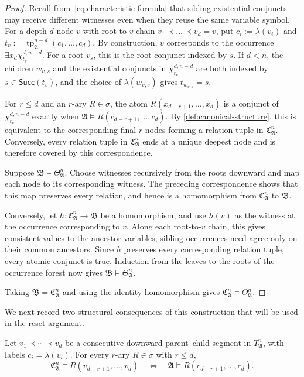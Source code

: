 \documentclass{lmcs}
\newcommand{\tp}{\operatorname{tp}}
\newcommand{\A}{\mathfrak{A}}
\newcommand{\B}{\mathfrak{B}}
\newcommand{\C}{\mathfrak{C}}
\begin{document}
\begin{proof}
Recall from~\eqref{eq:characteristic-formula} that sibling existential conjuncts may receive
different witnesses even when they reuse the same variable symbol.  For a
depth-$d$ node $v$ with root-to-$v$ chain
$v_1\prec\ldots\prec v_d=v$, put $c_i:=\lambda(v_i)$ and
$t_v:=\tp_{\A}^{n-d}(c_1,\ldots,c_d)$.  By construction, $v$ corresponds to
the occurrence $\exists x_d\chi_{t_v}^{d,n-d}$.  For a root $v_s$, this is
the root conjunct indexed by $s$.  If $d<n$, the children $w_{v,s}$ and the existential conjuncts in
$\chi_{t_v}^{d,n-d}$ are both indexed by $s\in\mathsf{Succ}(t_v)$, and the
choice of $\lambda(w_{v,s})$ gives $t_{w_{v,s}}=s$.

For $r\leq d$ and an $r$-ary $R\in\sigma$, the atom
$R(x_{d-r+1},\ldots,x_d)$ is a conjunct of $\chi_{t_v}^{d,n-d}$ exactly when
$\A\models R(c_{d-r+1},\ldots,c_d)$.  By
\cref{def:canonical-structure}, this is equivalent to the corresponding final
$r$ nodes forming a relation tuple in $\C_{\A}^{n}$.  Conversely, every
relation tuple in $\C_{\A}^{n}$ ends at a unique deepest node and is therefore
covered by this correspondence.

Suppose $\B\models\Theta_{\A}^{n}$.  Choose witnesses recursively from the
roots downward and map each node to its corresponding witness.  The preceding
correspondence shows that this map preserves every relation, and hence is a
homomorphism from $\C_{\A}^{n}$ to $\B$.

Conversely, let $h:\C_{\A}^{n}\to\B$ be a homomorphism, and use $h(v)$ as the
witness at the occurrence corresponding to $v$.  Along each root-to-$v$ chain,
this gives consistent values to the ancestor variables; sibling occurrences
need agree only on their common ancestors.  Since $h$ preserves every
corresponding relation tuple, every atomic conjunct is true.  Induction from
the leaves to the roots of the occurrence forest now gives
$\B\models\Theta_{\A}^{n}$.

Taking $\B=\C_{\A}^{n}$ and using the identity homomorphism gives
$\C_{\A}^{n}\models\Theta_{\A}^{n}$.
\end{proof}


We next record two structural consequences of this construction that
will be used in the reset argument.

\begin{prop}\label{prop:local-exact}
Let $v_1\prec\cdots\prec v_d$ be a consecutive downward parent--child segment in $T_{\A}^{n}$, with labels
$c_i=\lambda(v_i)$.  For every $r$-ary $R\in\sigma$ with $r\leq d$,
\[
 \C_{\A}^{n}\models R(v_{d-r+1},\ldots,v_d)
 \quad\Longleftrightarrow\quad
 \A\models R(c_{d-r+1},\ldots,c_d).
\]
\end{prop}
\end{document}

